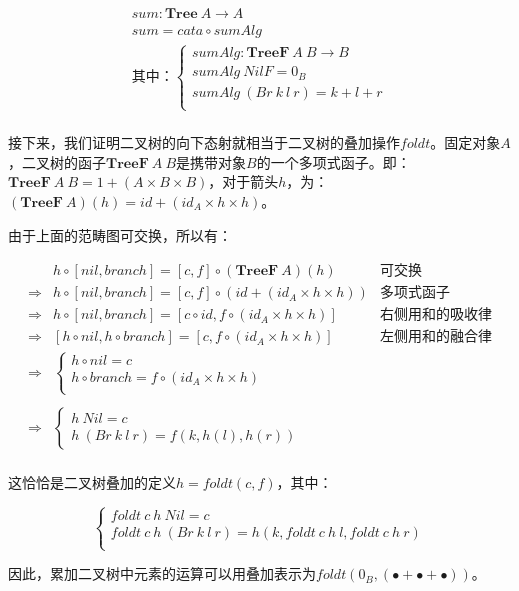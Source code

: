 \documentclass[b5paper]{ctexart}
\begin{document}
\begin{example}
\[
\begin{array}{l}
sum : \mathbf{Tree}\ A \to A \\
sum = cata \circ sumAlg \\
\text{其中：}
      \begin{cases}
        sumAlg : \mathbf{TreeF}\ A\ B \to B \\
        sumAlg\ NilF = 0_{B} \\
        sumAlg\ (Br\ k\ l\ r) = k + l + r \\
      \end{cases} \\
\end{array}
\]

接下来，我们证明二叉树的向下态射就相当于二叉树的叠加操作$foldt$。固定对象$A$，二叉树的函子$\mathbf{TreeF}\ A\ B$是携带对象$B$的一个多项式函子。即：$\mathbf{TreeF}\ A\ B = 1 + (A \times B \times B)$，对于箭头$h$，为：$(\mathbf{TreeF}\ A)(h) = id + (id_A \times h \times h)$。

由于上面的范畴图可交换，所以有：

\[
\begin{array}{rll}
            & h \circ [nil, branch] = [c, f] \circ (\mathbf{TreeF}\ A)(h) & \text{可交换} \\
\Rightarrow & h \circ [nil, branch] = [c, f] \circ (id + (id_A \times h \times h)) & \text{多项式函子} \\
\Rightarrow & h \circ [nil, branch] = [c \circ id, f \circ (id_A \times h \times h)] & \text{右侧用和的吸收律} \\
\Rightarrow & [h \circ nil, h \circ branch] = [c, f \circ (id_A \times h \times h)] & \text{左侧用和的融合律} \\
\Rightarrow &
  \begin{cases}
    h \circ nil = c \\
    h \circ branch = f \circ (id_A \times h \times h) \\
  \end{cases} & \\
\\
\Rightarrow &
  \begin{cases}
    h\ Nil = c \\
    h\ (Br\ k\ l\ r) = f(k, h(l), h(r))
  \end{cases} & \\
\end{array}
\]

这恰恰是二叉树叠加的定义$h = foldt(c, f)$，其中：

\[
\begin{cases}
foldt\ c\ h\ Nil = c \\
foldt\ c\ h\ (Br\ k\ l\ r) = h(k, foldt\ c\ h\ l, foldt\ c\ h\ r) \\
\end{cases}
\]

因此，累加二叉树中元素的运算可以用叠加表示为$foldt(0_B, (\bullet + \bullet + \bullet))$。
\end{example}
\end{document}
